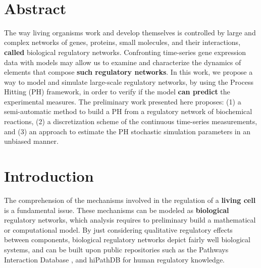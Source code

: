 \documentclass[11pt,a4paper,twoside]{epig}
\begin{document}
\\

\section*{Abstract}
\vspace{-2mm}
The way living organisms work and develop themselves is controlled by large and complex 
networks of genes, proteins, small molecules, and their interactions, \textbf{called} biological 
regulatory networks. Confronting time-series gene expression data with models may allow us to
examine and characterize the dynamics of elements that compose \textbf{such  regulatory networks}. 
In this work, we propose a way to model and simulate large-scale regulatory networks, by using the 
Process Hitting (PH) framework, in order to verify if the model \textbf{can predict} the experimental measures.
The preliminary work presented here proposes: (1) a semi-automatic method to build a PH from
a regulatory network of biochemical reactions, (2) a discretization scheme of the continuous time-series measurements, 
and (3) an approach to estimate the PH stochastic simulation parameters in an unbiased manner.
\vspace{-2mm}



\section{Introduction}
The comprehension of the mechanisms involved in the regulation of a \textbf{living cell} is a fundamental 
issue. These mechanisms can be modeled as \textbf{biological} regulatory networks, which analysis requires to preliminary build a 
mathematical or computational model. 
By just considering qualitative regulatory effects between components, biological regulatory networks
depict fairly well biological systems, and can be built upon public repositories such as the Pathways 
Interaction Database \cite{schaefer2009pid}, and 
hiPathDB\cite{yu2012hipathdb} for human regulatory knowledge.
\end{document}
